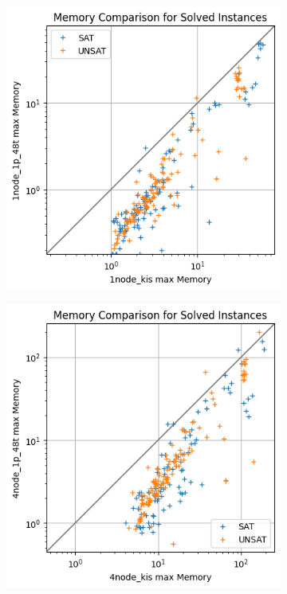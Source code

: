 \documentclass[12pt,a4paper,twoside]{scrartcl}
\numberwithin{equation}{section}
\begin{document}
\begin{figure}
  \center
  \begin{subfigure}[c]{.4\textwidth}
    \center
    \includegraphics[scale=.5]{plots/square_mem_compare/square_mem_1node.png}
    \label{fig:memCompare1node}
  \end{subfigure}
  \begin{subfigure}[c]{.4\textwidth}
    \center
    \includegraphics[scale=.5]{plots/square_mem_compare/square_mem_4node.png}

\end{subfigure}
\end{figure}
\end{document}

